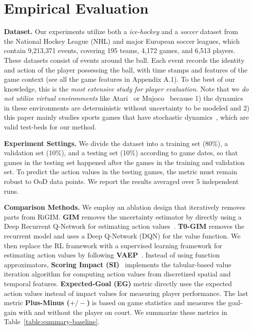 \documentclass{article}
\newcommand{\sys}{RiGIM}
\newcommand{\system}{\sys\;}
\begin{document}
\section{Empirical Evaluation}\label{Sec:experiment}

\noindent\textbf{Dataset.} 
Our experiments utilize both a {\it ice-hockey} and a {\it soccer} dataset from the National Hockey League (NHL) and major European soccer leagues, which contain 9,213,371 events, covering 195 teams, 4,172 games, and 6,513 players. These datasets consist of events around the ball. Each event records the identity and action of the player possessing the ball, with time stamps and features of the game context (see all the game features in Appendix A.1). To the best of our knowledge, this is the {\it most extensive study for player evaluation}. Note that we {\it do not utilize virtual environments} like Atari~\cite{bellemare2013arcade} or Mujoco~\cite{Todorov2012Mujoco} because 1) the dynamics in these environments are deterministic without uncertainty to be modeled and 2) this paper mainly studies sports games that have stochastic dynamics~\cite{schwartz2017handbook}, which are valid test-beds for our method.

\noindent\textbf{Experiment Settings.} We divide the dataset into a training set (80\%), a validation set (10\%), and a testing set (10\%) according to game dates, so that games in the testing set happened after the games in the training and validation set. To predict the action values in the testing games, the metric must remain robust to OoD data points.
We report the results averaged over 5 independent runs. 

\noindent\textbf{Comparison Methods.} We employ an ablation design that iteratively removes parts from \system.  {\bf GIM} removes the uncertainty estimator by directly using a Deep Recurrent Q-Network for estimating action values~\cite{Liu2018DRL}. {\bf T0-GIM} removes the recurrent model and uses a Deep Q-Network (DQN) for the value function. We then replace the RL framework with a supervised learning framework for estimating action values by following {\bf VAEP}~\cite{Decroos2019Actions}. Instead of using function approximators, {\bf Scoring Impact (SI)}~\cite{Routley2015Markov} implements the tabular-based value iteration algorithm for computing action values from discretized spatial and temporal features. {\bf Expected-Goal (EG)} metric directly uses the expected action values instead of impact values for measuring player performance. The last 
metric {\bf  Plus-Minus ($+/-$)}
is based on game statistics and measures the goal-gain with and without the player on court. We summarize these metrics in Table~\ref{table:summary-baseline}.
\end{document}
